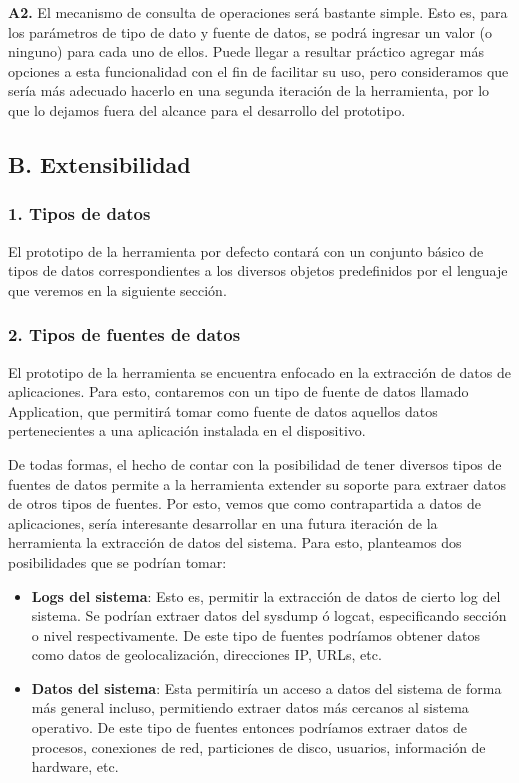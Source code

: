 \textbf{A2.} El mecanismo de consulta de operaciones será bastante simple. Esto es, para los parámetros de tipo de dato y fuente de datos, se podrá ingresar un valor (o ninguno) para cada uno de ellos. Puede llegar a resultar práctico agregar más opciones a esta funcionalidad con el fin de facilitar su uso, pero consideramos que sería más adecuado hacerlo en una segunda iteración de la herramienta, por lo que lo dejamos fuera del alcance para el desarrollo del prototipo.

\subsection*{B. Extensibilidad}
\subsubsection*{1. Tipos de datos}
El prototipo de la herramienta por defecto contará con un conjunto básico de tipos de datos correspondientes a los diversos objetos predefinidos por el lenguaje que veremos en la siguiente sección.

\subsubsection*{2. Tipos de fuentes de datos}
El prototipo de la herramienta se encuentra enfocado en la extracción de datos de aplicaciones. Para esto, contaremos con un tipo de fuente de datos llamado Application, que permitirá tomar como fuente de datos aquellos datos pertenecientes a una aplicación instalada en el dispositivo.

De todas formas, el hecho de contar con la posibilidad de tener diversos tipos de fuentes de datos permite a la herramienta extender su soporte para extraer datos de otros tipos de fuentes. Por esto, vemos que como contrapartida a datos de aplicaciones, sería interesante desarrollar en una futura iteración de la herramienta la extracción de datos del sistema. Para esto, planteamos dos posibilidades que se podrían tomar:

\begin{itemize}
\item \textbf{Logs del sistema}: Esto es, permitir la extracción de datos de cierto log del sistema. Se podrían extraer datos del sysdump ó logcat, especificando sección o nivel respectivamente. De este tipo de fuentes podríamos obtener datos como datos de geolocalización, direcciones IP, URLs, etc.
\item \textbf{Datos del sistema}: Esta permitiría un acceso a datos del sistema de forma más general incluso, permitiendo extraer datos más cercanos al sistema operativo. De este tipo de fuentes entonces podríamos extraer datos de procesos, conexiones de red, particiones de disco, usuarios, información de hardware, etc.
\end{itemize}

